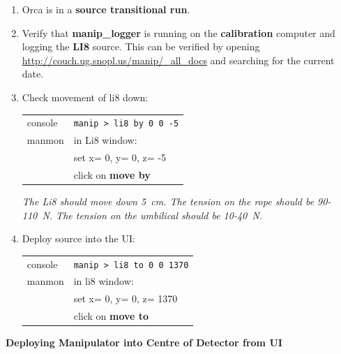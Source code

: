 \begin{enumerate}
\item \CheckBox[name=li8d12]{} Orca is in a {\bf source transitional run}.
\item \CheckBox[name=li8d13]{} Verify that {\bf manip\_logger} is running on the {\bf calibration} computer and logging the {\bf LI8} source. This can be verified by opening \url{http://couch.ug.snopl.us/manip/_all_docs} and searching for the current date.
\item \CheckBox[name=li8d14]{} Check movement of li8 down:
	\begin{center}
	\begin{tabular}{|l|l|}
	\hline
	console & \verb+manip > li8 by 0 0 -5+ \\
	manmon & in Li8 window: \\
	& set x= 0, y= 0, z= -5 \\
	& click on {\bf move by} \\
	\hline
	\end{tabular}
	\end{center}
{\it The Li8 should move down 5~cm. The tension on the rope should be 90-110~N. The tension on the umbilical should be 10-40~N.}
\item \CheckBox[name=li8d15]{} Deploy source into the UI:
	\begin{center}
	\begin{tabular}{|l|l|}
	\hline
	console & \verb+manip > li8 to 0 0 1370+ \\
	manmon & in li8 window: \\
	& set x= 0, y= 0, z= 1370 \\
	& click on {\bf move to} \\
	\hline
	\end{tabular}
	\end{center}
\end{enumerate}

{\bf Deploying Manipulator into Centre of Detector from UI}
	
